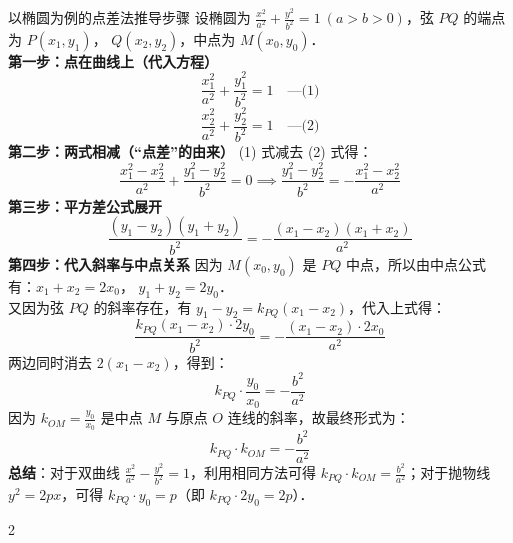 \documentclass[11pt,a4paper]{ctexart}
\begin{document}
\begin{teachbox}{以椭圆为例的点差法推导步骤}
设椭圆为 $\frac{x^2}{a^2} + \frac{y^2}{b^2} = 1\ (a>b>0)$，弦 $PQ$ 的端点为 $P(x_1, y_1)$， $Q(x_2, y_2)$，中点为 $M(x_0, y_0)$．\\
\textbf{第一步：点在曲线上（代入方程）}
\[ \frac{x_1^2}{a^2} + \frac{y_1^2}{b^2} = 1 \quad \text{---(1)} \]
\[ \frac{x_2^2}{a^2} + \frac{y_2^2}{b^2} = 1 \quad \text{---(2)} \]
\textbf{第二步：两式相减（“点差”的由来）}
(1) 式减去 (2) 式得：
\[ \frac{x_1^2 - x_2^2}{a^2} + \frac{y_1^2 - y_2^2}{b^2} = 0 \implies \frac{y_1^2 - y_2^2}{b^2} = -\frac{x_1^2 - x_2^2}{a^2} \]
\textbf{第三步：平方差公式展开}
\[ \frac{(y_1 - y_2)(y_1 + y_2)}{b^2} = -\frac{(x_1 - x_2)(x_1 + x_2)}{a^2} \]
\textbf{第四步：代入斜率与中点关系}
因为 $M(x_0, y_0)$ 是 $PQ$ 中点，所以由中点公式有：$x_1 + x_2 = 2x_0$， $y_1 + y_2 = 2y_0$．\\
又因为弦 $PQ$ 的斜率存在，有 $y_1 - y_2 = k_{PQ}(x_1 - x_2)$，代入上式得：
\[ \frac{k_{PQ}(x_1 - x_2) \cdot 2y_0}{b^2} = -\frac{(x_1 - x_2) \cdot 2x_0}{a^2} \]
两边同时消去 $2(x_1 - x_2)$，得到：
\[ k_{PQ} \cdot \frac{y_0}{x_0} = -\frac{b^2}{a^2} \]
因为 $k_{OM} = \frac{y_0}{x_0}$ 是中点 $M$ 与原点 $O$ 连线的斜率，故最终形式为：
\[ k_{PQ} \cdot k_{OM} = -\frac{b^2}{a^2} \]
\textbf{总结}：对于双曲线 $\frac{x^2}{a^2} - \frac{y^2}{b^2} = 1$，利用相同方法可得 $k_{PQ} \cdot k_{OM} = \frac{b^2}{a^2}$；对于抛物线 $y^2 = 2px$，可得 $k_{PQ} \cdot y_0 = p$（即 $k_{PQ} \cdot 2y_0 = 2p$）．
\end{teachbox}

\vspace{1em}

{\small \qConicDefThreeSlopeProofStem}
\begin{center}
  \qConicDefThreeSlopeProofFigure
\end{center}

\begin{paracol}{2}
\switchcolumn
{}
\end{paracol}

\newpage

\end{document}
